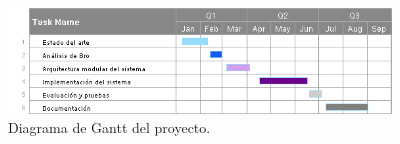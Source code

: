 \begin{figure}[tb]
\begin{center}
\includegraphics[width=4in]{./img/Proyecto-grado.png}
\caption{Diagrama de Gantt del proyecto.}\label{fig1}
\end{center}
\end{figure}








